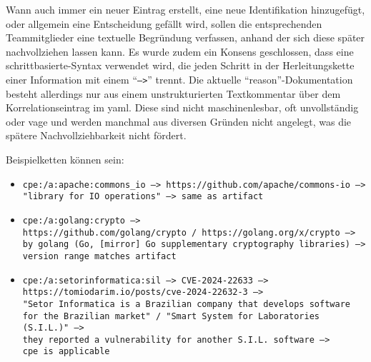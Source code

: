 
Wann auch immer ein neuer Eintrag erstellt, eine neue Identifikation hinzugefügt, oder allgemein eine Entscheidung gefällt wird, sollen die entsprechenden Teammitglieder eine textuelle Begründung verfassen, anhand der sich diese später nachvollziehen lassen kann.
Es wurde zudem ein Konsens geschlossen, dass eine schrittbasierte-Syntax verwendet wird, die jeden Schritt in der Herleitungskette einer Information mit einem \enquote{\texttt{-->}} trennt.
Die aktuelle \enquote{reason}-Dokumentation besteht allerdings nur aus einem unstrukturierten Textkommentar über dem Korrelationseintrag im \acrshort{yaml}.
Diese sind nicht maschinenlesbar, oft unvollständig oder vage und werden manchmal aus diversen Gründen nicht angelegt, was die spätere Nachvollziehbarkeit nicht fördert.

Beispielketten können sein:

\begin{itemize}
    \itemsep0em
    \item \texttt{cpe:/a:apache:commons\_io --> https://github.com/apache/commons-io --> "library for IO operations" --> same as artifact}
    \item \texttt{cpe:/a:golang:crypto\ -->\\https://github.com/golang/crypto / https://golang.org/x/crypto\ --> by golang (Go, [mirror] Go supplementary cryptography libraries)\ --> version range matches artifact}
    \item \texttt{cpe:/a:setorinformatica:sil\ --> CVE-2024-22633\ -->\\https://tomiodarim.io/posts/cve-2024-22632-3 -->\\"Setor Informatica is a Brazilian company that develops software for the Brazilian market" / "Smart System for Laboratories (S.I.L.)"\ -->\\they reported a vulnerability for another S.I.L. software -->\\cpe is applicable}
\end{itemize}

